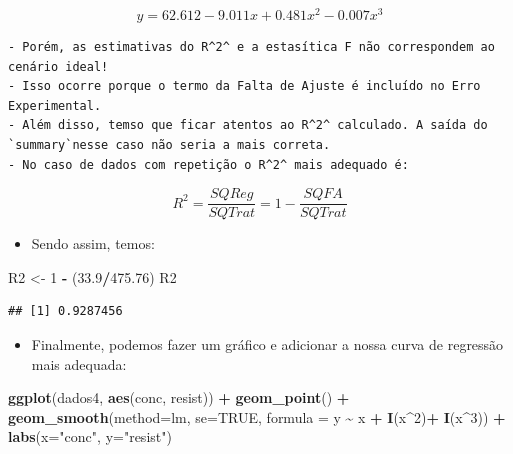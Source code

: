 \documentclass[
]{book}
\newenvironment{Shaded}{\begin{snugshade}}{\end{snugshade}}
\newcommand{\AttributeTok}[1]{\textcolor[rgb]{0.13,0.29,0.53}{#1}}
\newcommand{\ConstantTok}[1]{\textcolor[rgb]{0.56,0.35,0.01}{#1}}
\newcommand{\DecValTok}[1]{\textcolor[rgb]{0.00,0.00,0.81}{#1}}
\newcommand{\FloatTok}[1]{\textcolor[rgb]{0.00,0.00,0.81}{#1}}
\newcommand{\FunctionTok}[1]{\textcolor[rgb]{0.13,0.29,0.53}{\textbf{#1}}}
\newcommand{\NormalTok}[1]{#1}
\newcommand{\OtherTok}[1]{\textcolor[rgb]{0.56,0.35,0.01}{#1}}
\newcommand{\SpecialCharTok}[1]{\textcolor[rgb]{0.81,0.36,0.00}{\textbf{#1}}}
\newcommand{\StringTok}[1]{\textcolor[rgb]{0.31,0.60,0.02}{#1}}
\providecommand{\tightlist}{%
  \setlength{\itemsep}{0pt}\setlength{\parskip}{0pt}}
\begin{document}
\[y=62.612-9.011x+0.481x^2-0.007x^3\]

\begin{verbatim}
- Porém, as estimativas do R^2^ e a estasítica F não correspondem ao cenário ideal!
- Isso ocorre porque o termo da Falta de Ajuste é incluído no Erro Experimental.
- Além disso, temso que ficar atentos ao R^2^ calculado. A saída do `summary`nesse caso não seria a mais correta.
- No caso de dados com repetição o R^2^ mais adequado é:
\end{verbatim}

\[R^{2}= \frac{SQReg}{SQTrat}=1-\frac{SQFA}{SQTrat}\]

\begin{itemize}
\tightlist
\item
  Sendo assim, temos:
\end{itemize}

\begin{Shaded}
\begin{Highlighting}[]
\NormalTok{R2 }\OtherTok{\textless{}{-}} \DecValTok{1} \SpecialCharTok{{-}}\NormalTok{ (}\FloatTok{33.9}\SpecialCharTok{/}\FloatTok{475.76}\NormalTok{)}
\NormalTok{R2}
\end{Highlighting}
\end{Shaded}

\begin{verbatim}
## [1] 0.9287456
\end{verbatim}

\begin{itemize}
\tightlist
\item
  Finalmente, podemos fazer um gráfico e adicionar a nossa curva de regressão mais adequada:
\end{itemize}

\begin{Shaded}
\begin{Highlighting}[]
\FunctionTok{ggplot}\NormalTok{(dados4, }\FunctionTok{aes}\NormalTok{(conc, resist)) }\SpecialCharTok{+}
  \FunctionTok{geom\_point}\NormalTok{() }\SpecialCharTok{+}
  \FunctionTok{geom\_smooth}\NormalTok{(}\AttributeTok{method=}\StringTok{\textquotesingle{}lm\textquotesingle{}}\NormalTok{, }\AttributeTok{se=}\ConstantTok{TRUE}\NormalTok{, }\AttributeTok{formula =}\NormalTok{ y }\SpecialCharTok{\textasciitilde{}}\NormalTok{ x }\SpecialCharTok{+} \FunctionTok{I}\NormalTok{(x}\SpecialCharTok{\^{}}\DecValTok{2}\NormalTok{)}\SpecialCharTok{+} \FunctionTok{I}\NormalTok{(x}\SpecialCharTok{\^{}}\DecValTok{3}\NormalTok{)) }\SpecialCharTok{+}
  \FunctionTok{labs}\NormalTok{(}\AttributeTok{x=}\StringTok{"conc"}\NormalTok{, }\AttributeTok{y=}\StringTok{"resist"}\NormalTok{)}
\end{Highlighting}
\end{Shaded}
\end{document}

